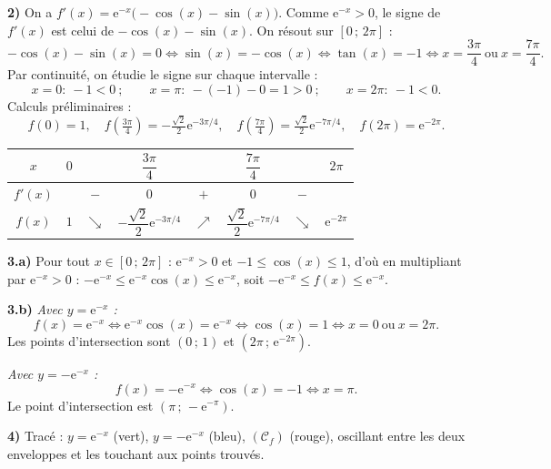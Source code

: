 \smallskip
\noindent\textbf{2)} On a $f'(x)=\mathrm{e}^{-x}\big(-\cos(x)-\sin(x)\big)$. Comme $\mathrm{e}^{-x}>0$, le signe de
$f'(x)$ est celui de $-\cos(x)-\sin(x)$. On résout sur $[0\,;\,2\pi]$ :
\[ -\cos(x)-\sin(x)=0\iff\sin(x)=-\cos(x)\iff\tan(x)=-1\iff x=\frac{3\pi}{4}\ \text{ou}\ x=\frac{7\pi}{4}. \]
Par continuité, on étudie le signe sur chaque intervalle :
\[ x=0:\ -1<0\ ;\qquad x=\pi:\ -(-1)-0=1>0\ ;\qquad x=2\pi:\ -1<0. \]
Calculs préliminaires :
\[ f(0)=1,\quad f\!\left(\tfrac{3\pi}{4}\right)=-\tfrac{\sqrt2}{2}\mathrm{e}^{-3\pi/4},\quad
f\!\left(\tfrac{7\pi}{4}\right)=\tfrac{\sqrt2}{2}\mathrm{e}^{-7\pi/4},\quad f(2\pi)=\mathrm{e}^{-2\pi}. \]

\begin{center}\renewcommand{\arraystretch}{1.6}
\begin{tabular}{|c|ccccccc|}
\hline
$x$ & $0$ && $\dfrac{3\pi}{4}$ && $\dfrac{7\pi}{4}$ && $2\pi$\\
\hline
$f'(x)$ & & $-$ & $0$ & $+$ & $0$ & $-$ &\\
\hline
$f(x)$ & $1$ & $\searrow$ & $-\dfrac{\sqrt2}{2}\mathrm{e}^{-3\pi/4}$ & $\nearrow$ & $\dfrac{\sqrt2}{2}\mathrm{e}^{-7\pi/4}$ & $\searrow$ & $\mathrm{e}^{-2\pi}$\\
\hline
\end{tabular}
\end{center}

\smallskip
\noindent\textbf{3.a)} Pour tout $x\in[0\,;\,2\pi]$ : $\mathrm{e}^{-x}>0$ et $-1\le\cos(x)\le1$, d'où en
multipliant par $\mathrm{e}^{-x}>0$ : $-\mathrm{e}^{-x}\le\mathrm{e}^{-x}\cos(x)\le\mathrm{e}^{-x}$, soit $-\mathrm{e}^{-x}\le f(x)\le\mathrm{e}^{-x}$.

\smallskip
\noindent\textbf{3.b)} \emph{Avec $y=\mathrm{e}^{-x}$ :}
\[ f(x)=\mathrm{e}^{-x}\iff\mathrm{e}^{-x}\cos(x)=\mathrm{e}^{-x}\iff\cos(x)=1\iff x=0\ \text{ou}\ x=2\pi. \]
Les points d'intersection sont $(0\,;\,1)$ et $(2\pi\,;\,\mathrm{e}^{-2\pi})$.

\emph{Avec $y=-\mathrm{e}^{-x}$ :}
\[ f(x)=-\mathrm{e}^{-x}\iff\cos(x)=-1\iff x=\pi. \]
Le point d'intersection est $(\pi\,;\,-\mathrm{e}^{-\pi})$.

\smallskip
\noindent\textbf{4)} Tracé : $y=\mathrm{e}^{-x}$ (vert), $y=-\mathrm{e}^{-x}$ (bleu), $(\mathcal{C}_f)$ (rouge),
oscillant entre les deux enveloppes et les touchant aux points trouvés.

\begin{illus}
\end{illus}

